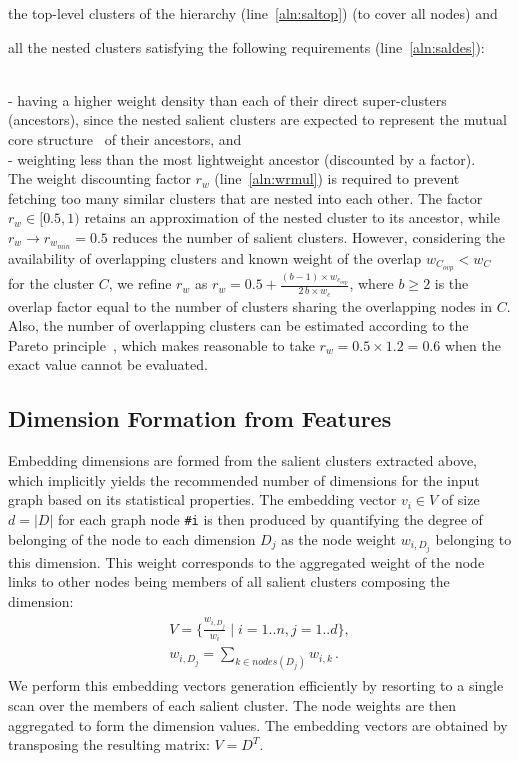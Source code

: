 \documentclass[conference]{IEEEtran}
\begin{document}
\begin{inparaenum}
\item the top-level clusters of the hierarchy (line~\ref{aln:saltop}) (to cover all nodes) and
\item all the nested clusters satisfying the following requirements (line~\ref{aln:saldes}):
\end{inparaenum}
\\- having a higher weight density than each of their direct super-clusters (ancestors), since the nested salient clusters are expected to represent the mutual core structure~\cite{Borg00} of their ancestors, and
\\- weighting less than the most lightweight ancestor (discounted by a factor).\\The weight discounting factor $r_w$ (line~\ref{aln:wrmul}) is required to prevent fetching too many similar clusters that are nested into each other. The factor $r_w \in [0.5, 1)$ retains an approximation of the nested cluster to its ancestor, while $r_w \rightarrow r_{w_{min}} = 0.5$ reduces the number of salient clusters. However, considering the availability of overlapping clusters and known weight of the overlap $w_{C_{ovp}} < w_C$ for the cluster $C$, we refine $r_w$ as $r_w = 0.5 + \frac{(b - 1) \times w_{c_{ovp}}}{2\, b \times w_c}$, where $b \ge 2$ is the overlap factor equal to the number of clusters sharing the overlapping nodes in $C$.
Also, the number of overlapping clusters can be estimated according to the Pareto principle~\cite{Pareto,Geor86}, which makes reasonable to take $r_{w} = 0.5 \times 1.2 = 0.6$ when the exact value cannot be evaluated. 




\subsection{Dimension Formation from Features}  \label{subsec:dimform}


Embedding dimensions are formed from the salient clusters extracted above, which implicitly yields the recommended number of dimensions for the input graph based on its statistical properties.
The embedding vector $v_i \in V$ of size $d = |D|$ for each graph node \verb|#i| is then produced by quantifying the degree of belonging of the node to each dimension $D_j$ as the node weight $w_{i,D_j}$ belonging to this dimension. This weight corresponds to the aggregated weight of the node links to other nodes being members of all salient clusters composing the dimension:
\begin{align}\begin{split}
V = \{ \frac{w_{i,D_j}}{w_i}\; |\; i = 1..n, j = 1..d \},\\
w_{i,D_j} = \sum_{k \in nodes(D_j)} w_{i, k}\,.
\end{split}\end{align}
We perform this embedding vectors generation efficiently by resorting to a single scan over the members of each salient cluster. The node weights are then aggregated to form the dimension values. The embedding vectors are obtained by transposing the resulting matrix: $V = D^T$. 
\end{document}
